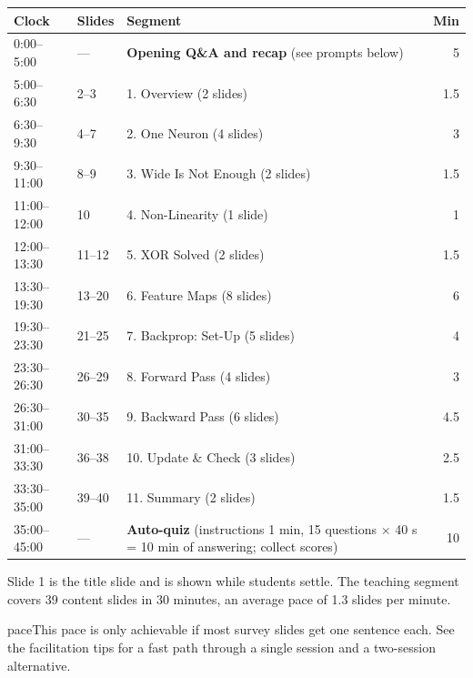 \documentclass[11pt]{article}
\begin{document}
\begin{center}\small\renewcommand{\arraystretch}{1.2}\begin{tabularx}{\textwidth}{@{}l l X r@{}}\toprule\textbf{Clock} & \textbf{Slides} & \textbf{Segment} & \textbf{Min}\\\midrule

0:00--5:00 & --- & \textbf{Opening Q\&A and recap} (see prompts below) & 5\\

5:00--6:30 & 2--3 & 1. Overview (2 slides) & 1.5\\

6:30--9:30 & 4--7 & 2. One Neuron (4 slides) & 3\\

9:30--11:00 & 8--9 & 3. Wide Is Not Enough (2 slides) & 1.5\\

11:00--12:00 & 10 & 4. Non-Linearity (1 slide) & 1\\

12:00--13:30 & 11--12 & 5. XOR Solved (2 slides) & 1.5\\

13:30--19:30 & 13--20 & 6. Feature Maps (8 slides) & 6\\

19:30--23:30 & 21--25 & 7. Backprop: Set-Up (5 slides) & 4\\

23:30--26:30 & 26--29 & 8. Forward Pass (4 slides) & 3\\

26:30--31:00 & 30--35 & 9. Backward Pass (6 slides) & 4.5\\

31:00--33:30 & 36--38 & 10. Update \& Check (3 slides) & 2.5\\

33:30--35:00 & 39--40 & 11. Summary (2 slides) & 1.5\\

35:00--45:00 & --- & \textbf{Auto-quiz} (instructions 1 min, 15 questions $\times$ 40 s = 10 min of answering; collect scores) & 10\\\bottomrule\end{tabularx}\end{center}

Slide 1 is the title slide and is shown while students settle. The teaching segment covers 39 content slides in 30 minutes, an average pace of 1.3 slides per minute. 

\begin{pitfall}{pace}This pace is only achievable if most survey slides get one sentence each. See the facilitation tips for a fast path through a single session and a two-session alternative.\end{pitfall}
\end{document}
